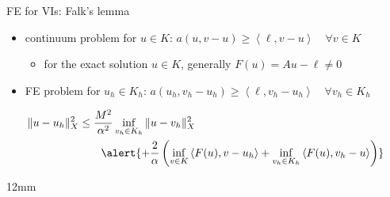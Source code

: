 \documentclass[aspectratio=169,10pt]{beamer}
\newcommand{\ip}[2]{\left\langle #1, #2 \right\rangle}
\newcommand{\lc}{{\text{\large $\circ$}}}
\begin{document}
\begin{frame}{FE for VIs: Falk's lemma}

\begin{itemize}
\item continuum problem for $u\in K$: \quad $a(u,v-u) \ge \ip{\ell}{v-u} \quad \forall v\in K$
    \begin{itemize}
    \item[$\lc$] for the exact solution $u\in K$, generally \alert{$F(u) = Au-\ell \ne 0$}
        \end{itemize}

\vspace{-12mm}
\hfill 

\vspace{-8mm}
\item FE problem for $u_h\in K_h$: \quad $a(u_h,v_h-u_h) \ge \ip{\ell}{v_h-u_h} \quad \forall v_h\in K_h$
\end{itemize}

\begin{lemma}[Falk, 1974]

\vspace{-5mm}
\begin{align*}
\|u-u_h\|_X^2 &\le \frac{M^2}{\alpha^2} \inf_{v_h\in K_h} \|u - v_h\|_X^2 \\
   &\qquad \alert{+ \frac{2}{\alpha} \left(\inf_{v\in K} \ip{F(u)}{v-u_h} + \inf_{v_h\in K_h} \ip{F(u)}{v_h-u}\right)}
\end{align*}
\end{lemma}

\begin{overlayarea}{\textwidth}{12mm}
\vspace{-2mm}
\end{overlayarea}
\end{frame}
\end{document}
